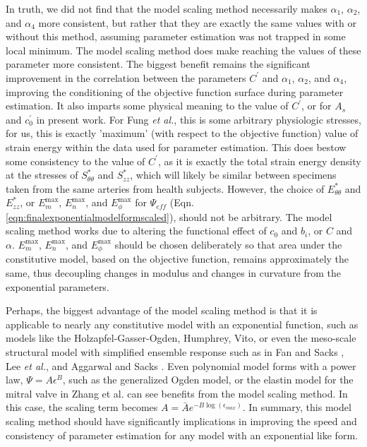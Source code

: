 	In truth, we did not find that the model scaling method necessarily makes $\alpha_1$, $\alpha_2$, and $\alpha_4$ more consistent, but rather that they are exactly the same values with or without this method, assuming parameter estimation was not trapped in some local minimum. The model scaling method does make reaching the values of these parameter more consistent. The biggest benefit remains the significant improvement in the correlation between the parameters $C^\prime$ and $\alpha_1$, $\alpha_2$, and $\alpha_4$, improving the conditioning of the objective function surface during parameter estimation. It also imparts some physical meaning to the value of $C^\prime$, or for $A_s$ and $c_0^\prime$ in present work. For Fung \textit{et al.}, this is some arbitrary physiologic stresses, for us, this is exactly 'maximum' (with respect to the objective function) value of strain energy within the data used for parameter estimation. This does bestow some consistency to the value of $C^\prime$, as it is exactly the total strain energy density at the stresses of $S_{\theta\theta}^*$ and $S_{zz}^*$, which will likely be similar between specimens taken from the same arteries from health subjects. However, the choice of $E_{\theta\theta}^*$ and $E_{zz}^*$, or $E_m^\mathrm{max}$, $E_n^\mathrm{max}$, and $E_\phi^\mathrm{max}$ for $\Psi_{eff}$ (Eqn. \ref{eqn:finalexponentialmodelformscaled}), should not be arbitrary. The model scaling method works due to altering the functional effect of $c_0$ and $b_i$, or $C$ and $\alpha$. $E_m^\mathrm{max}$, $E_n^\mathrm{max}$, and $E_\phi^\mathrm{max}$ should be chosen deliberately so that area under the constitutive model, based on the objective function, remains approximately the same, thus decoupling changes in modulus and changes in curvature from the exponential parameters. 


	Perhaps, the biggest advantage of the model scaling method is that it is applicable to nearly any constitutive model with an exponential function, such as models like the Holzapfel-Gasser-Ogden, Humphrey, Vito, or even the meso-scale structural model with simplified ensemble response such as in Fan and Sacks \cite{fan_simulation_2014}, Lee \textit{et al.}\cite{lee_effects_2015}, and Aggarwal and Sacks \cite{aggarwal_inverse_2015}. Even polynomial model forms with a power law, $\Psi=A\epsilon^B$, such as the generalized Ogden model, or the elastin model for the mitral valve in Zhang et al. \cite{zhang_meso_2016} can see benefits from the model scaling method. In this case, the scaling term becomes $A = \bar{A} e^{-B \log(\epsilon_{max})}$. In summary, this model scaling method should have significantly implications in improving the speed and consistency of parameter estimation for any model with an exponential like form.
    
